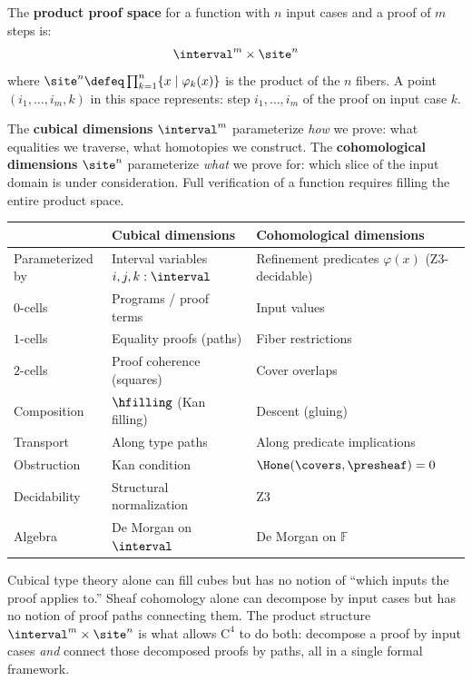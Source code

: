 \begin{definition}
\label{def:product-space}
The \textbf{product proof space} for a function with $n$ input cases and
a proof of $m$ steps is:
\[
  \interval^m \times \site^n
\]
where $\site^n \defeq \prod_{k=1}^n \{x \mid \varphi_k(x)\}$ is the
product of the $n$ fibers.  A point $(i_1, \ldots, i_m, k)$ in this space
represents: step $i_1, \ldots, i_m$ of the proof on input case $k$.

\medskip
\noindent The \textbf{cubical dimensions} $\interval^m$ parameterize
\emph{how} we prove: what equalities we traverse, what homotopies we
construct.  The \textbf{cohomological dimensions} $\site^n$ parameterize
\emph{what} we prove for: which slice of the input domain is under
consideration.  Full verification of a function requires filling the
entire product space.
\end{definition}

\begin{center}
\begin{tabular}{lll}
\toprule
& \textbf{Cubical dimensions} & \textbf{Cohomological dimensions} \\
\midrule
Parameterized by & Interval variables $i, j, k : \interval$ &
  Refinement predicates $\varphi(x)$ (Z3-decidable) \\
$0$-cells & Programs / proof terms & Input values \\
$1$-cells & Equality proofs (paths) & Fiber restrictions \\
$2$-cells & Proof coherence (squares) & Cover overlaps \\
Composition & $\hfilling$ (Kan filling) & Descent (gluing) \\
Transport & Along type paths & Along predicate implications \\
Obstruction & Kan condition & $\Hone(\covers, \presheaf) = 0$ \\
Decidability & Structural normalization & Z3 \\
Algebra & De Morgan on $\interval$ & De Morgan on $\mathbb{F}$ \\
\bottomrule
\end{tabular}
\end{center}

\begin{remark}
Cubical type theory alone can fill cubes but has no notion of ``which inputs
the proof applies to.''  Sheaf cohomology alone can decompose by input cases
but has no notion of proof paths connecting them.  The product structure
$\interval^m \times \site^n$ is what allows $\mathrm{C}^4$ to do both:
decompose a proof by input cases \emph{and} connect those decomposed proofs
by paths, all in a single formal framework.
\end{remark}


